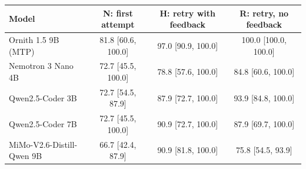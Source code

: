 \begin{tabular}{lccc}\toprule Model & N: first attempt & H: retry with feedback & R: retry, no feedback\\\midrule
Ornith 1.5 9B (MTP) & 81.8 [60.6, 100.0] & 97.0 [90.9, 100.0] & 100.0 [100.0, 100.0] \\
Nemotron 3 Nano 4B & 72.7 [45.5, 100.0] & 78.8 [57.6, 100.0] & 84.8 [60.6, 100.0] \\
Qwen2.5-Coder 3B & 72.7 [54.5, 87.9] & 87.9 [72.7, 100.0] & 93.9 [84.8, 100.0] \\
Qwen2.5-Coder 7B & 72.7 [45.5, 100.0] & 90.9 [72.7, 100.0] & 87.9 [69.7, 100.0] \\
MiMo-V2.6-Distill-Qwen 9B & 66.7 [42.4, 87.9] & 90.9 [81.8, 100.0] & 75.8 [54.5, 93.9] \\
\bottomrule\end{tabular}
